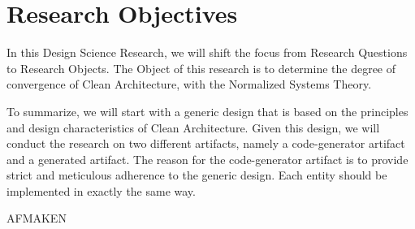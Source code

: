 \section{Research Objectives} \label{sec_research_objectives}

In this Design Science Research, we will shift the focus from Research Questions to
Research Objects. The Object of this research is to determine the degree of convergence of
Clean Architecture, with the Normalized Systems Theory. 

To summarize, we will start with a generic design that is based on the principles and
design characteristics of Clean Architecture. Given this design, we will conduct the
research on two different artifacts, namely a code-generator artifact and a generated
artifact. The reason for the code-generator artifact is to provide strict and meticulous
adherence to the generic design. Each entity should be implemented in exactly the same way.

AFMAKEN








